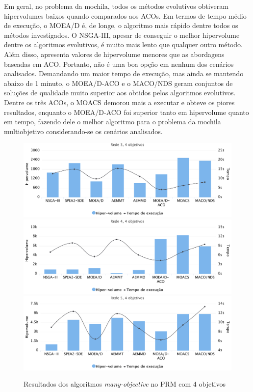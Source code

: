 Em geral, no problema da mochila, todos os métodos evolutivos obtiveram hipervolumes baixos quando comparados aos ACOs. Em termos de tempo médio de execução, o MOEA/D é, de longe, o algoritmo mais rápido dentre todos os métodos investigados. O NSGA-III, apesar de conseguir o melhor hipervolume dentre os algoritmos evolutivos, é muito mais lento que qualquer outro método. Além disso, apresenta valores de hipervolume menores que as abordagens baseadas em ACO. Portanto, não é uma boa opção em nenhum dos cenários analisados. Demandando um maior tempo de execução, mas ainda se mantendo abaixo de 1 minuto, o MOEA/D-ACO e o MACO/NDS geram conjuntos de soluções de qualidade muito superior aos obtidos pelos algoritmos evolutivos. Dentre os três ACOs, o MOACS demorou mais a executar e obteve os piores resultados, enquanto o MOEA/D-ACO foi superior tanto em hipervolume quanto em tempo, fazendo dele o melhor algoritmo para o problema da mochila multiobjetivo considerando-se os cenários analisados.

\begin{figure}[!htbp]	
	\includegraphics[width=1\textwidth]{cap_experimentos/figs/etapa4/r3o4}
	\includegraphics[width=1\textwidth]{cap_experimentos/figs/etapa4/r4o4}
	\includegraphics[width=1\textwidth]{cap_experimentos/figs/etapa4/r5o4}
	\caption{\label{fig_exp4_mrp_o4}Resultados dos algoritmos \textit{many-objective} no PRM com 4 objetivos}
\end{figure}

